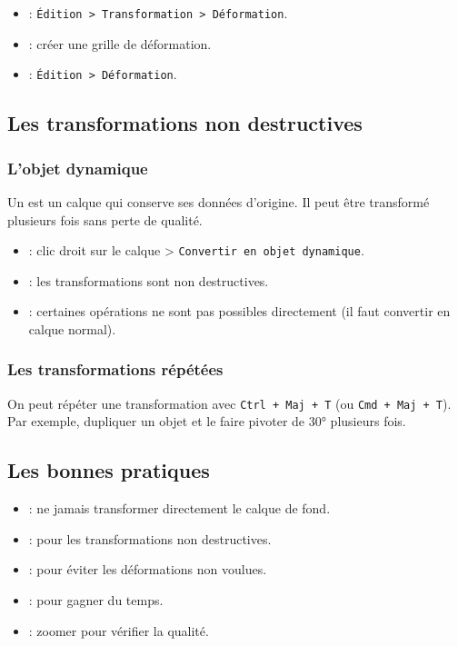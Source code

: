 \begin{itemize}
    \item {} : \texttt{Édition > Transformation > Déformation}.
    \item {} : créer une grille de déformation.
    \item {} : \texttt{Édition > Déformation}.
\end{itemize}

\subsection{Les transformations non destructives}

\subsubsection{L'objet dynamique}

Un  est un calque qui conserve ses données d'origine. Il peut être transformé plusieurs fois sans perte de qualité.

\begin{itemize}
    \item {} : clic droit sur le calque > \texttt{Convertir en objet dynamique}.
    \item {} : les transformations sont non destructives.
    \item {} : certaines opérations ne sont pas possibles directement (il faut convertir en calque normal).
\end{itemize}

\subsubsection{Les transformations répétées}

On peut répéter une transformation avec \texttt{Ctrl + Maj + T} (ou \texttt{Cmd + Maj + T}). Par exemple, dupliquer un objet et le faire pivoter de 30° plusieurs fois.

\subsection{Les bonnes pratiques}

\begin{itemize}
    \item {} : ne jamais transformer directement le calque de fond.
    \item {} : pour les transformations non destructives.
    \item {} : pour éviter les déformations non voulues.
    \item {} : pour gagner du temps.
    \item {} : zoomer pour vérifier la qualité.
\end{itemize}

